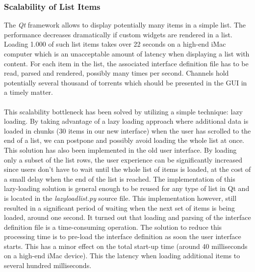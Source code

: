 \subsubsection{\textbf{Scalability of List Items}}
The \emph{Qt} framework allows to display potentially many items in a simple list. The performance decreases dramatically if custom widgets are rendered in a list. Loading 1.000 of such list items takes over 22 seconds on a high-end iMac computer which is an unacceptable amount of latency when displaying a list with content. For each item in the list, the associated interface definition file has to be read, parsed and rendered, possibly many times per second. Channels hold potentially several thousand of torrents which should be presented in the GUI in a timely matter.\\\\
This scalability bottleneck has been solved by utilizing a simple technique: lazy loading. By taking advantage of a lazy loading approach where additional data is loaded in chunks (30 items in our new interface) when the user has scrolled to the end of a list, we can postpone and possibly avoid loading the whole list at once. This solution has also been implemented in the old user interface. By loading only a subset of the list rows, the user experience can be significantly increased since users don't have to wait until the whole list of items is loaded, at the cost of a small delay when the end of the list is reached. The implementation of this lazy-loading solution is general enough to be reused for any type of list in Qt and is located in the \emph{lazyloadlist.py} source file. This implementation however, still resulted in a significant period of waiting when the next set of items is being loaded, around one second. It turned out that loading and parsing of the interface definition file is a time-consuming operation. The solution to reduce this processing time is to pre-load the interface definition as soon the user interface starts. This has a minor effect on the total start-up time (around 40 milliseconds on a high-end iMac device). This the latency when loading additional items to several hundred milliseconds.

